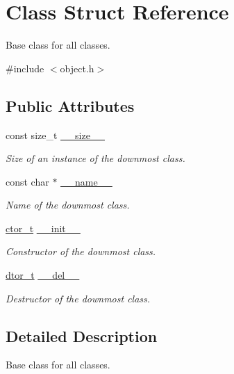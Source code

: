 \hypertarget{structClass}{}\section{Class Struct Reference}
\label{structClass}


Base class for all classes.  




{\ttfamily \#include $<$object.\+h$>$}

\subsection*{Public Attributes}
\begin{DoxyCompactItemize}
\item 
const size\+\_\+t \hyperlink{structClass_a8a34012f942d8eb18fbd6fbe8dc93427}{\+\_\+\+\_\+size\+\_\+\+\_\+}
\begin{DoxyCompactList}\small\item\em Size of an instance of the downmost class. \end{DoxyCompactList}\item 
const char $\ast$ \hyperlink{structClass_a24cc8ca77df58f6c3c1369cef0e28f25}{\+\_\+\+\_\+name\+\_\+\+\_\+}
\begin{DoxyCompactList}\small\item\em Name of the downmost class. \end{DoxyCompactList}\item 
\hyperlink{object_8h_aca5cf19b49d188bffd264eabb5519a6b}{ctor\+\_\+t} \hyperlink{structClass_a078235c167b0b3b3b8cb0f9f83e5cb82}{\+\_\+\+\_\+init\+\_\+\+\_\+}
\begin{DoxyCompactList}\small\item\em Constructor of the downmost class. \end{DoxyCompactList}\item 
\hyperlink{object_8h_a3f11982530649b5e16938c75dd5ea9dc}{dtor\+\_\+t} \hyperlink{structClass_a2203173ad2d2705449a29b868097c28e}{\+\_\+\+\_\+del\+\_\+\+\_\+}
\begin{DoxyCompactList}\small\item\em Destructor of the downmost class. \end{DoxyCompactList}\end{DoxyCompactItemize}


\subsection{Detailed Description}
Base class for all classes. 

